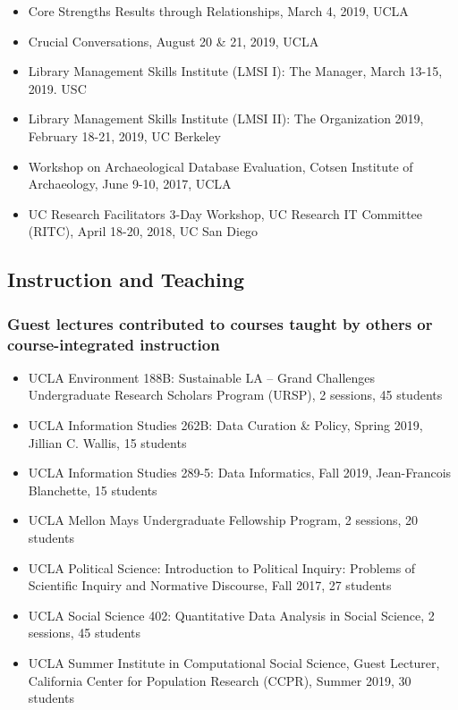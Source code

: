 
\begin{itemize}[label={},leftmargin=!,labelindent=5pt,itemindent=-15pt]
  \item Core Strengths Results through Relationships, March 4, 2019, UCLA
  \item Crucial Conversations, August 20 \& 21, 2019, UCLA
  \item Library Management Skills Institute (LMSI I): The Manager, March 13-15, 2019. USC
  \item Library Management Skills Institute (LMSI II): The Organization 2019, February 18-21, 2019, UC Berkeley
  \item Workshop on Archaeological Database Evaluation, Cotsen Institute of Archaeology, June 9-10, 2017, UCLA
  \item UC Research Facilitators 3-Day Workshop,  UC Research IT Committee (RITC), April 18-20, 2018, UC San Diego
\end{itemize}



\subsection{Instruction and Teaching}

\subsubsection{Guest lectures contributed to courses taught by others or course-integrated instruction}

\begin{itemize}[label={}, leftmargin=!,labelindent=5pt,itemindent=-15pt]
  \item UCLA Environment 188B: Sustainable LA – Grand Challenges Undergraduate Research Scholars Program (URSP), 2 sessions, 45 students
  \item UCLA Information Studies 262B: Data Curation \& Policy, Spring 2019, Jillian C. Wallis, 15 students
  \item UCLA Information Studies 289-5: Data Informatics, Fall 2019, Jean-Francois Blanchette, 15 students
  \item UCLA Mellon Mays Undergraduate Fellowship Program, 2 sessions, 20 students
  \item UCLA Political Science: Introduction to Political Inquiry: Problems of Scientific Inquiry and Normative Discourse, Fall 2017, 27 students
  \item UCLA Social Science 402: Quantitative Data Analysis in Social Science, 2 sessions, 45 students
  \item UCLA Summer Institute in Computational Social Science, Guest Lecturer, California Center for Population Research (CCPR), Summer 2019, 30 students
\end{itemize}

